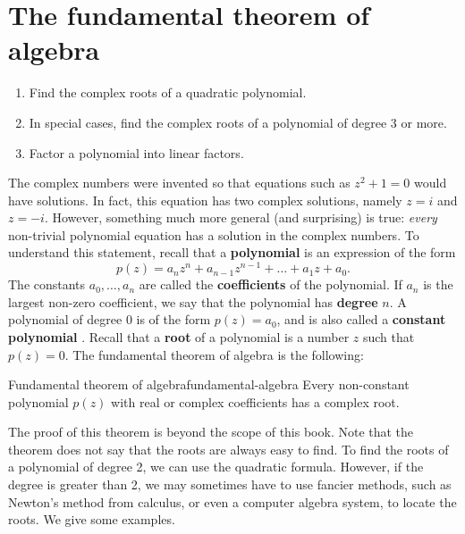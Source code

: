 \section{The fundamental theorem of algebra}

\begin{outcome}
  \begin{enumerate}
  \item Find the complex roots of a quadratic polynomial.
  \item In special cases, find the complex roots of a polynomial of
    degree 3 or more.
  \item Factor a polynomial into linear factors.
  \end{enumerate}
\end{outcome}

The complex numbers were invented so that equations such as $z^2+1=0$
would have solutions. In fact, this equation has two complex
solutions, namely $z=i$ and $z=-i$. However, something much more
general (and surprising) is true: {\em every} non-trivial polynomial
equation has a solution in the complex numbers. To understand this
statement, recall that a \textbf{polynomial}%
 is an expression of the form
\begin{equation*}
  p(z) = a_nz^n + a_{n-1}z^{n-1} + \ldots + a_1z + a_0.
\end{equation*}
The constants $a_0,\ldots,a_n$ are called the \textbf{coefficients}%
%
 of the polynomial. If $a_n$ is the
largest non-zero coefficient, we say that the polynomial has
\textbf{degree}%
%
 $n$. A polynomial of degree $0$ is of the
form $p(z) = a_0$, and is also called a \textbf{constant polynomial}%
%
. Recall that a \textbf{root}%
%
 of a polynomial is a number $z$ such that
$p(z)=0$.  The fundamental theorem of algebra is the following:

\begin{theorem}{Fundamental theorem of algebra}{fundamental-algebra}
  Every non-constant polynomial $p(z)$ with real or complex
  coefficients has a complex root.
\end{theorem}

The proof of this theorem is beyond the scope of this book. Note that
the theorem does not say that the roots are always easy to find. To
find the roots of a polynomial of degree 2, we can use the quadratic
formula. However, if the degree is greater than 2, we may sometimes
have to use fancier methods, such as Newton's method from calculus, or
even a computer algebra system, to locate the roots. We give some
examples.

